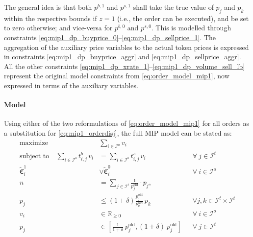 \documentclass[11pt,parskip=full]{scrartcl}%
\newcommand*{\ie}{i.e., }
\newcommand*{\itokens}{\mathcal{I}^t}       %
\newcommand*{\iorders}{\mathcal{I}^o}       %
\begin{document}
The general idea is that both $ p^{b,1} $ and $ p^{s,1} $ shall take the true value of $ p_j $ and
$ p_k $ within the respective bounds if $ z = 1 $ (\ie the order can be executed), and be set to
zero otherwise; and vice-versa for $ p^{b,0} $ and $ p^{s,0} $.
This is modelled through constraints \eqref{eq:mip1_dp_buyprice_0}--\eqref{eq:mip1_dp_sellprice_1}.
The aggregation of the auxiliary price variables to the actual token prices is expressed in
constraints \eqref{eq:mip1_dp_buyprice_aggr} and \eqref{eq:mip1_dp_sellprice_aggr}.
All the other constraints \eqref{eq:mip1_dp_xrate_1}--\eqref{eq:mip1_dp_volume_sell_lb} represent
the original model constraints from \eqref{eq:order_model_mip1}, now expressed in terms of the
auxiliary variables.

\paragraph{Model}

Using either of the two reformulations of \eqref{eq:order_model_mip1} for all orders as a
substitution for \eqref{eq:mip1_orderdisj}, the full MIP model can be stated as:
\begin{subequations}
\begin{align}
  \text{maximize} \quad & \sum\limits_{i \in \iorders} v_i
  \label{eq:mip1_objective}
  \\[2mm]
  \text{subject to} \quad
  \sum\limits_{i \in \iorders} t^b_{i,j} \, v_i
  &= \sum\limits_{i \in \iorders} t^s_{i,j} \, v_i
  && \forall \> j \in \itokens
  \label{eq:mip1_tokenbalance}
  \\[4mm]
  \tilde{\mathfrak{C}}^1_i &\lor \tilde{\mathfrak{C}}^0_i
  && \forall \> i \in \iorders
  \label{eq:mip1_orderdisj} 
  \\[2mm]
  n
  &= \sum\limits_{j \in \itokens} \frac{1}{p^\mathrm{old}_j} \cdot p_j,
  \label{eq:mip1_reftoken}
  \\[1mm]
  p_j
  &\le \left(1+\delta\right) \frac{p^\mathrm{old}_j}{p^\mathrm{old}_k} \, p_k
  && \forall j,k \in \itokens \times \itokens
  \label{eq:mip1_maxfluct}
  \\[2mm]
  v_i
  &\in \mathbb{R}_{\ge 0}
  && \forall \> i \in \iorders
  \\[1mm]
  p_j
  &\in \left[ \frac{1} {1+\delta} \> p^\mathrm{old}_j, (1+\delta) \> p^\mathrm{old}_j \right]
  && \forall \> j \in \itokens
\end{align}
\label{eq:mip1}
\end{subequations}
\end{document}

